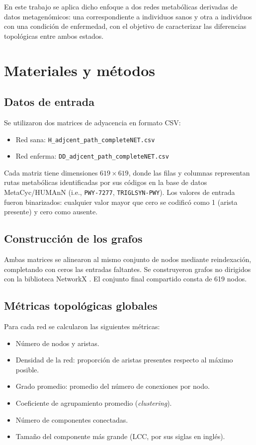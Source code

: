 \documentclass[conference]{IEEEtran}
\begin{document}
 En este trabajo se aplica dicho enfoque a dos redes metabólicas derivadas de datos metagenómicos: una correspondiente a individuos sanos y otra a individuos con una condición de enfermedad, con el objetivo de caracterizar las diferencias topológicas entre ambos estados.

\section{Materiales y métodos}

\subsection{Datos de entrada}

Se utilizaron dos matrices de adyacencia en formato CSV:

\begin{itemize}[leftmargin=*]
    \item Red sana: \nolinkurl{H_adjcent_path_completeNET.csv}
    \item Red enferma: \nolinkurl{DD_adjcent_path_completeNET.csv}
\end{itemize}

Cada matriz tiene dimensiones $619 \times 619$, donde las filas y columnas representan rutas metabólicas identificadas por sus códigos en la base de datos MetaCyc/HUMAnN (i.e., \nolinkurl{PWY-7277}, \nolinkurl{TRIGLSYN-PWY}). Los valores de entrada fueron binarizados: cualquier valor mayor que cero se codificó como 1 (arista presente) y cero como ausente.

\subsection{Construcción de los grafos}

Ambas matrices se alinearon al mismo conjunto de nodos mediante reindexación, completando con ceros las entradas faltantes. Se construyeron grafos no dirigidos con la biblioteca NetworkX \cite{hagberg2008}. El conjunto final compartido consta de 619 nodos.

\subsection{Métricas topológicas globales}

Para cada red se calcularon las siguientes métricas:

\begin{itemize}[leftmargin=*]
    \item Número de nodos y aristas.
    \item Densidad de la red: proporción de aristas presentes respecto al máximo posible.
    \item Grado promedio: promedio del número de conexiones por nodo.
    \item Coeficiente de agrupamiento promedio (\emph{clustering}).
    \item Número de componentes conectadas.
    \item Tamaño del componente más grande (LCC, por sus siglas en inglés).
\end{itemize}
\end{document}
